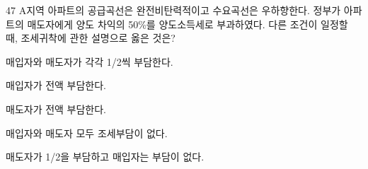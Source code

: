 \begin{question}{47}
A지역 아파트의 공급곡선은 완전비탄력적이고 수요곡선은 우하향한다. 정부가 아파트의 매도자에게 양도 차익의 50\%를 양도소득세로 부과하였다. 다른 조건이 일정할 때, 조세귀착에 관한 설명으로 옳은 것은?
\begin{choices}
  \item 매입자와 매도자가 각각 1/2씩 부담한다.
  \item 매입자가 전액 부담한다.
  \item 매도자가 전액 부담한다.
  \item 매입자와 매도자 모두 조세부담이 없다.
  \item 매도자가 1/2을 부담하고 매입자는 부담이 없다.
\end{choices}
\end{question}
